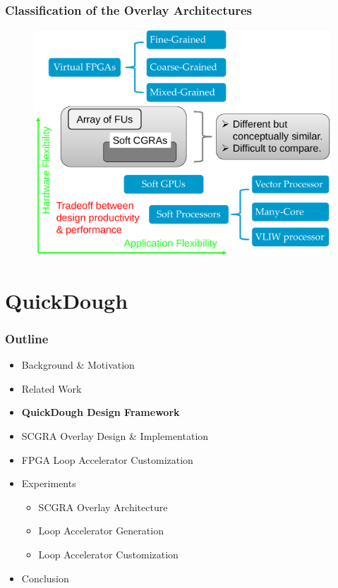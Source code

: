 \documentclass[accentcolor=tud1a,colorbacktitle,inverttitle,landscape,german,presentation,t]{tudbeamer}
\begin{document}
   \begin{frame}
   \vspace{-1em}
   \frametitle{Classification of the Overlay Architectures}
   \begin{figure}
      \includegraphics[width=.75\linewidth]{overlay-classification2}
   \end{figure}
   \vspace{-0.6em}
   \color{red}{It is difficult to quantify the 'complexity, compute intensity and even parallelism' of an application as well as design effort, so it is difficult to benchmark and compare.}
   \end{frame}

\section{QuickDough}
  \begin{frame}
  \frametitle{Outline}
  \begin{itemize}
  \setlength{\itemsep}{6pt}
  \item Background \& Motivation
  \item Related Work
  \item \textbf{QuickDough Design Framework}
  \item SCGRA Overlay Design \& Implementation
  \item FPGA Loop Accelerator Customization
  \item Experiments
  \begin{itemize}
    \setlength{\itemsep}{6pt}
    \item SCGRA Overlay Architecture
    \item Loop Accelerator Generation
    \item Loop Accelerator Customization
  \end{itemize}
  \item Conclusion
  \end{itemize}
  \end{frame}
\end{document}
